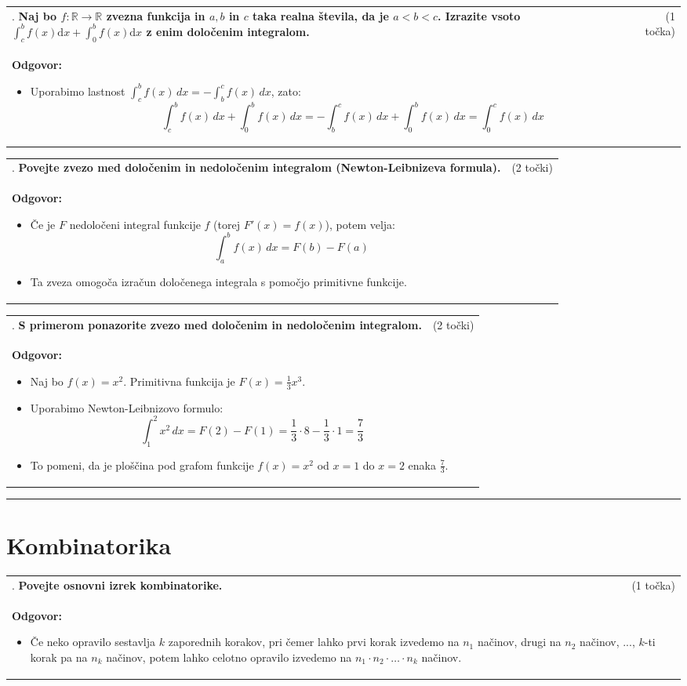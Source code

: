 \documentclass[12pt]{article}
\newcounter{vprasanje}[section]
\renewcommand{\thevprasanje}{\roman{vprasanje}}
\newcommand{\vprasanje}[2]{%
  \stepcounter{vprasanje}%
  \textbf{\thevprasanje}. \textbf{#1} & (#2) \\
}
\newcommand{\odgovor}[1]{%
  \multicolumn{2}{p{\dimexpr\textwidth-2\tabcolsep\relax}}{%
    \small \textbf{Odgovor:} #1%
  } \\[1em]%
}
\newcommand{\crta}{\rule{\textwidth}{0.4pt}}
\newcommand{\naslov}[1]{%
  \vspace{1em} 
  \section{#1}
  \addcontentsline{toc}{section}{\protect\numberline{}#1}%
}
\newcommand{\razmak}[1]{%
  \vspace{#1}
}
\begin{document}
\begin{tabularx}{\textwidth}{X r}
\vprasanje{Naj bo $f: \mathbb{R} \rightarrow \mathbb{R}$ zvezna funkcija in $a, b$ in $c$ taka realna števila, da je $a<b<c$. Izrazite vsoto $\int_c^b f(x) \mathrm{d} x+\int_0^b f(x) \mathrm{d} x$ z enim določenim integralom.}{1 točka}
\odgovor{
\begin{itemize}
  \item Uporabimo lastnost $\int_c^b f(x)\, dx = -\int_b^c f(x)\, dx$, zato:
  \[
  \int_c^b f(x)\, dx + \int_0^b f(x)\, dx = -\int_b^c f(x)\, dx + \int_0^b f(x)\, dx = \int_0^c f(x)\, dx
  \]
\end{itemize}
}
\end{tabularx}

\begin{tabularx}{\textwidth}{X r}
\vprasanje{Povejte zvezo med določenim in nedoločenim integralom (Newton-Leibnizeva formula).}{2 točki}
\odgovor{
\begin{itemize}
  \item Če je $F$ nedoločeni integral funkcije $f$ (torej $F'(x) = f(x)$), potem velja:
  \[
  \int_a^b f(x)\, dx = F(b) - F(a)
  \]
  \item Ta zveza omogoča izračun določenega integrala s pomočjo primitivne funkcije.
\end{itemize}
}
\end{tabularx}

\begin{tabularx}{\textwidth}{X r}
\vprasanje{S primerom ponazorite zvezo med določenim in nedoločenim integralom.}{2 točki}
\odgovor{
\begin{itemize}
  \item Naj bo $f(x) = x^2$. Primitivna funkcija je $F(x) = \frac{1}{3}x^3$.
  \item Uporabimo Newton-Leibnizovo formulo:
  \[
  \int_1^2 x^2\, dx = F(2) - F(1) = \frac{1}{3} \cdot 8 - \frac{1}{3} \cdot 1 = \frac{7}{3}
  \]
  \item To pomeni, da je ploščina pod grafom funkcije $f(x) = x^2$ od $x=1$ do $x=2$ enaka $\frac{7}{3}$.
\end{itemize}
}
\end{tabularx}

\razmak{0.5em}

\crta

\naslov{Kombinatorika}

\begin{tabularx}{\textwidth}{X r}
\vprasanje{Povejte osnovni izrek kombinatorike.}{1 točka}
\odgovor{
\begin{itemize}
  \item Če neko opravilo sestavlja $k$ zaporednih korakov, pri čemer lahko prvi korak izvedemo na $n_1$ načinov, drugi na $n_2$ načinov, ..., $k$-ti korak pa na $n_k$ načinov, potem lahko celotno opravilo izvedemo na $n_1 \cdot n_2 \cdot \dots \cdot n_k$ načinov.
\end{itemize}
}
\end{tabularx}
\end{document}
